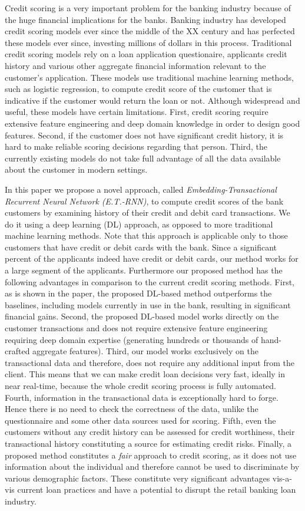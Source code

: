 \documentclass[sigconf]{acmart}
\begin{document}
Credit scoring is a very important problem for the banking industry because of the huge financial implications for the banks. Banking industry has developed credit scoring models ever since the middle of the XX century  and has perfected these models ever since, investing millions of dollars in this process. Traditional credit scoring models rely on a loan application questionaire, applicants credit history and various other aggregate financial information relevant to the customer's application. These models use traditional machine learning methods, such as logistic regression, to compute credit score of the customer that is indicative if the customer would return the loan or not. Although widespread and useful, these models have certain limitations. First, credit scoring require extensive feature engineering and deep domain knowledge in order to design good features.
Second, if the customer does not have significant credit history, it is hard to make reliable scoring decisions regarding that person. Third, the currently existing models do not take full advantage of all the data available about the customer in modern settings.

In this paper we propose a novel approach, called \textit{Embedding-Transactional Recurrent Neural Network (E.T.-RNN)}, to compute credit scores of the bank customers by examining history of their credit and debit card transactions.
We do it using a deep learning (DL) approach, as opposed to more traditional machine learning methods.
Note that this approach is applicable only to those customers that have credit or debit cards with the bank. Since a significant percent of the applicants indeed have credit or debit cards, our method works for a large segment of the applicants. Furthermore our proposed method has the following advantages in comparison to the current credit scoring methods.
First, as is shown in the paper, the proposed DL-based method outperforms the baselines, including models currently in use in the bank, resulting in significant financial gains.
Second, the proposed DL-based model works directly on the customer transactions and does not require extensive feature engineering requiring deep domain expertise (generating hundreds or thousands of hand-crafted aggregate features).
Third, our model works exclusively on the transactional data and therefore, does not require any additional input from the client. This means that we can make credit loan decisions very fast, ideally in near real-time, because the whole credit scoring process is fully automated.
Fourth, information in the transactional data is exceptionally hard to forge. Hence there is no need to check the correctness of the data, unlike the questionnaire and some other data sources used for scoring.
Fifth, even the customers without any credit history can be assessed for credit worthiness, their transactional history constituting a source for estimating credit risks.
Finally, a proposed method  constitutes a \textit{fair} approach to credit scoring, as it does not use information about the individual and therefore cannot be used to discriminate by various demographic factors.
These constitute very significant advantages vis-a-vis current loan practices and have a potential to disrupt the retail banking loan industry.
\end{document}
